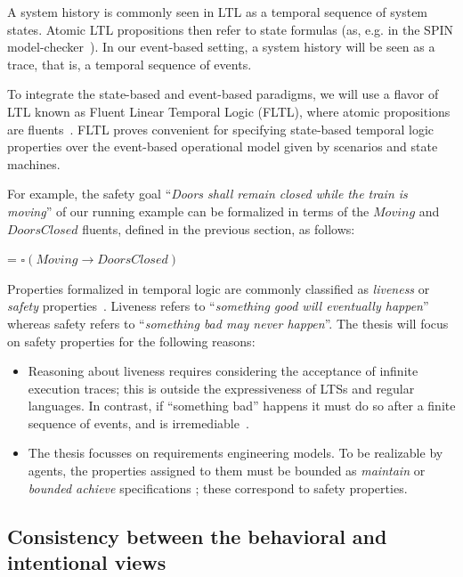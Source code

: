 A system history is commonly seen in LTL as a temporal sequence of system states. Atomic LTL propositions then refer to state formulas (as, e.g. in the SPIN model-checker~\cite{Holzmann:1997}). In our event-based setting, a system history will be seen as a trace, that is, a temporal sequence of events. 

To integrate the state-based and event-based paradigms, we will use a flavor of LTL known as Fluent Linear Temporal Logic (FLTL), where atomic propositions are fluents~\cite{Giannakopoulou:2003}. FLTL proves convenient for specifying state-based temporal logic properties over the event-based operational model given by scenarios and state machines. 

For example, the safety goal ``\emph{Doors shall remain closed while the train is moving}'' of our running example can be formalized in terms of the $Moving$ and $DoorsClosed$ fluents, defined in the previous section, as follows:

\begin{center}
 = $\square(Moving \rightarrow DoorsClosed)$
\end{center}

Properties formalized in temporal logic are commonly classified as \emph{liveness} or \emph{safety} properties~\cite{Alpern:1986}. Liveness refers to ``\emph{something good will eventually happen}'' whereas safety refers to  ``\emph{something bad may never happen}''. The thesis will focus on safety properties for the following reasons:

\begin{itemize}
\item Reasoning about liveness requires considering the acceptance of infinite execution traces; this is outside the expressiveness of LTSs and regular languages. In contrast, if ``something bad'' happens it must do so after a finite sequence of events, and is irremediable~\cite{Alpern:1986, Giannakopoulou:1999}.
\item The thesis focusses on requirements engineering models. To be realizable by agents, the properties assigned to them must be bounded as \emph{maintain} or \emph{bounded achieve} specifications \cite{Letier:2002}; these correspond to safety properties.  
\end{itemize}

\subsection{Consistency between the behavioral and intentional views\label{subsection:background-goals-consistency}}

